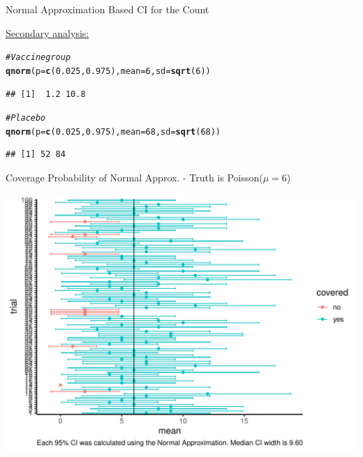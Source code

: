 \documentclass[10pt,handout]{beamer}\usepackage[]{graphicx}\usepackage[]{color}
\makeatletter
\def\maxwidth{ %
  \ifdim\Gin@nat@width>\linewidth
    \linewidth
  \else
    \Gin@nat@width
  \fi
}
\newcommand{\hlnum}[1]{\textcolor[rgb]{0.686,0.059,0.569}{#1}}%
\newcommand{\hlcom}[1]{\textcolor[rgb]{0.678,0.584,0.686}{\textit{#1}}}%
\newcommand{\hlstd}[1]{\textcolor[rgb]{0.345,0.345,0.345}{#1}}%
\newcommand{\hlkwc}[1]{\textcolor[rgb]{0.333,0.667,0.333}{#1}}%
\newcommand{\hlkwd}[1]{\textcolor[rgb]{0.737,0.353,0.396}{\textbf{#1}}}%
\newenvironment{kframe}{%
 \def\at@end@of@kframe{}%
 \ifinner\ifhmode%
  \def\at@end@of@kframe{\end{minipage}}%
  \begin{minipage}{\columnwidth}%
 \fi\fi%
 \def\FrameCommand##1{\hskip\@totalleftmargin \hskip-\fboxsep
 \colorbox{shadecolor}{##1}\hskip-\fboxsep
     \hskip-\linewidth \hskip-\@totalleftmargin \hskip\columnwidth}%
 \MakeFramed {\advance\hsize-\width
   \@totalleftmargin\z@ \linewidth\hsize
   \@setminipage}}%
 {\par\unskip\endMakeFramed%
 \at@end@of@kframe}
\newenvironment{knitrout}{}{} %
\makeatother
\begin{document}
\begin{frame}[fragile]{Normal Approximation Based CI for the Count}
	
	\underline{Secondary analysis:}
	\vspace{0.1in}
\begin{knitrout}\tiny
{}\color{fgcolor}\begin{kframe}
\begin{alltt}
\hlcom{# Vaccine group}
\hlkwd{qnorm}\hlstd{(}\hlkwc{p} \hlstd{=} \hlkwd{c}\hlstd{(}\hlnum{0.025}\hlstd{,} \hlnum{0.975}\hlstd{),} \hlkwc{mean} \hlstd{=} \hlnum{6}\hlstd{,} \hlkwc{sd} \hlstd{=} \hlkwd{sqrt}\hlstd{(}\hlnum{6}\hlstd{))}
\end{alltt}
\begin{verbatim}
## [1]  1.2 10.8
\end{verbatim}
\begin{alltt}
\hlcom{# Placebo}
\hlkwd{qnorm}\hlstd{(}\hlkwc{p} \hlstd{=} \hlkwd{c}\hlstd{(}\hlnum{0.025}\hlstd{,} \hlnum{0.975}\hlstd{),} \hlkwc{mean} \hlstd{=} \hlnum{68}\hlstd{,} \hlkwc{sd} \hlstd{=} \hlkwd{sqrt}\hlstd{(}\hlnum{68}\hlstd{))}
\end{alltt}
\begin{verbatim}
## [1] 52 84
\end{verbatim}
\end{kframe}
\end{knitrout}
	
\end{frame}


\begin{frame}[fragile]{Coverage Probability of Normal Approx. - Truth is Poisson($\mu=6$)}
	
\begin{knitrout}\tiny
{}\color{fgcolor}

{\centering \includegraphics[width=\maxwidth]{figure/unnamed-chunk-4-1} 

}



\end{knitrout}
	
\end{frame}
\end{document}
